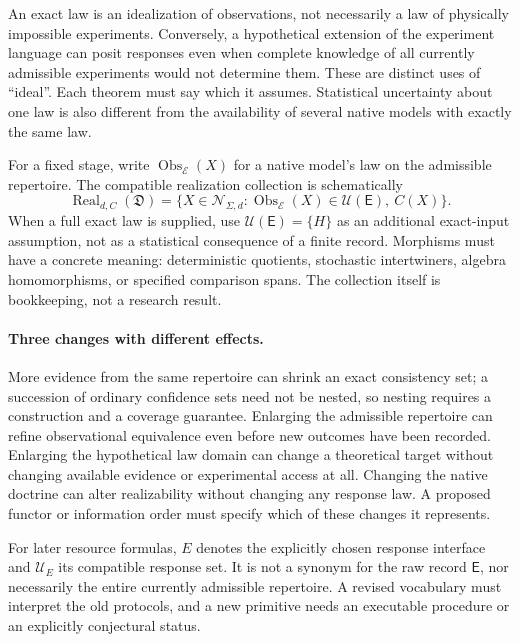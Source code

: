 \documentclass[11pt]{article}
\theoremstyle{remark}
\newcommand{\Obs}{\operatorname{Obs}}
\newcommand{\Real}{\operatorname{Real}}
\newcommand{\calE}{\mathcal E}
\newcommand{\calN}{\mathcal N}
\newcommand{\calU}{\mathcal U}
\begin{document}
An exact law is an idealization of observations, not necessarily a law of physically impossible experiments. Conversely, a hypothetical extension of the experiment language can posit responses even when complete knowledge of all currently admissible experiments would not determine them. These are distinct uses of ``ideal''. Each theorem must say which it assumes. Statistical uncertainty about one law is also different from the availability of several native models with exactly the same law.

For a fixed stage, write $\Obs_{\calE}(X)$ for a native model's law on the admissible repertoire. The compatible realization collection is schematically
\begin{equation}
 \Real_{d,C}(\mathfrak D)
 =\{X\in\calN_{\Sigma,d}:\Obs_{\calE}(X)\in\calU(\mathsf E),\ C(X)\}.
 \label{eq:consistent}
\end{equation}
When a full exact law is supplied, use $\calU(\mathsf E)=\{H\}$ as an additional exact-input assumption, not as a statistical consequence of a finite record. Morphisms must have a concrete meaning: deterministic quotients, stochastic intertwiners, algebra homomorphisms, or specified comparison spans. The collection itself is bookkeeping, not a research result.

\paragraph{Three changes with different effects.}
More evidence from the same repertoire can shrink an exact consistency set; a succession of ordinary confidence sets need not be nested, so nesting requires a construction and a coverage guarantee. Enlarging the admissible repertoire can refine observational equivalence even before new outcomes have been recorded. Enlarging the hypothetical law domain can change a theoretical target without changing available evidence or experimental access at all. Changing the native doctrine can alter realizability without changing any response law. A proposed functor or information order must specify which of these changes it represents.

For later resource formulas, $E$ denotes the explicitly chosen response interface and $\calU_E$ its compatible response set. It is not a synonym for the raw record $\mathsf E$, nor necessarily the entire currently admissible repertoire. A revised vocabulary must interpret the old protocols, and a new primitive needs an executable procedure or an explicitly conjectural status.
\end{document}
